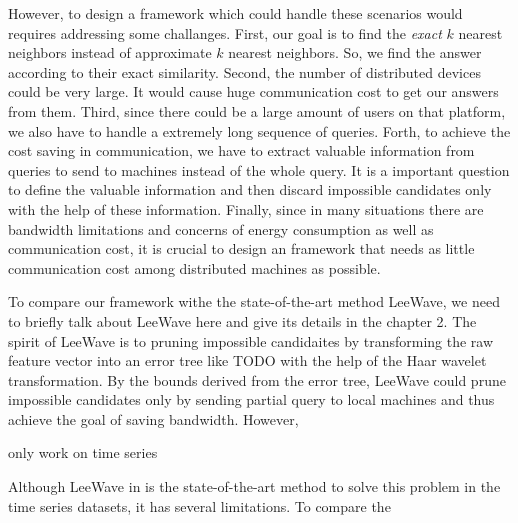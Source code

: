 However, to design a framework which could handle these scenarios would requires addressing some challanges.  First, our goal is to find the \emph{exact} $k$ nearest neighbors instead of approximate $k$ nearest neighbors.  So, we find the answer according to their exact similarity.  Second, the number of distributed devices could be very large. It would cause huge communication cost to get our answers from them.  Third, since there could be a large amount of users on that platform, we also have to handle a extremely long sequence of queries.  Forth, to achieve the cost saving in communication, we have to extract valuable information from queries to send to machines instead of the whole query.  It is a important question to define the valuable information and then discard impossible candidates only with the help of these information.  Finally, since in many situations there are bandwidth limitations and concerns of energy consumption as well as communication cost, it is crucial to design an framework that needs as little communication cost among distributed machines as possible.

To compare our framework withe the state-of-the-art method LeeWave, we need to briefly talk about LeeWave here and give its details in the chapter 2.  The spirit of LeeWave is to pruning impossible candidaites by transforming the raw feature vector into an error tree like TODO with the help of the Haar wavelet transformation.  By the bounds derived from the error tree, LeeWave could prune impossible candidates only by sending partial query to local machines and thus achieve the goal of saving bandwidth.  However, 

only work on time series

Although LeeWave in \cite{LeeWave} is the state-of-the-art method to solve this problem in the time series datasets, it has several limitations.  To compare the 

